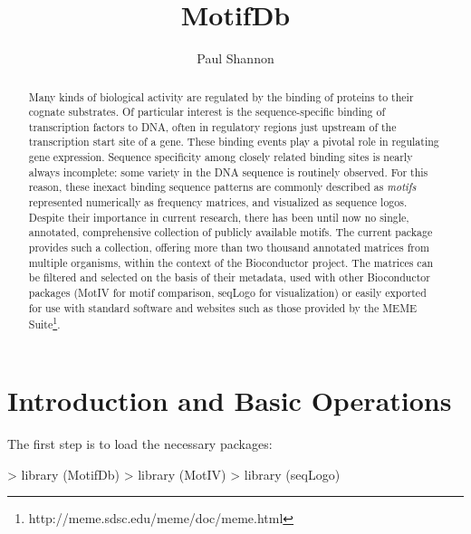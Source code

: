 \documentclass{article}
\title{MotifDb}
\author{Paul Shannon}
\renewenvironment{Schunk}{\vspace{\topsep}}{\vspace{\topsep}}
\begin{document}
 

\maketitle
\begin{abstract}
Many kinds of biological activity are regulated by the binding of proteins to their cognate
substrates.  Of particular interest is the sequence-specific binding of transcription factors to DNA, often in
regulatory regions just upstream of the transcription start site of a gene.  These binding events play a pivotal
role in regulating gene expression.  Sequence specificity among closely related binding sites is nearly always incomplete: some variety
in the DNA sequence is routinely observed.  For this reason, these inexact binding sequence patterns are commonly
described as \emph{motifs} represented numerically as frequency matrices, and visualized as sequence logos.  Despite their importance
in current research, there has been until now no single, annotated, comprehensive collection of publicly available motifs.
The current package provides such a collection, offering more than two thousand annotated matrices from multiple organisms, within the
context of the Bioconductor project.  The matrices can be filtered and selected on the basis of their metadata, used with other
Bioconductor packages (MotIV for motif comparison, seqLogo for visualization) or easily exported for use with 
standard software and websites such as those provided by the MEME Suite\footnote{http://meme.sdsc.edu/meme/doc/meme.html}.
\end{abstract}

\tableofcontents

\section{Introduction and Basic Operations}

The first step is to load the necessary packages:

\begin{Schunk}
\begin{Sinput}
> library (MotifDb)
> library (MotIV)
> library (seqLogo)
\end{Sinput}
\end{Schunk}
\end{document}
